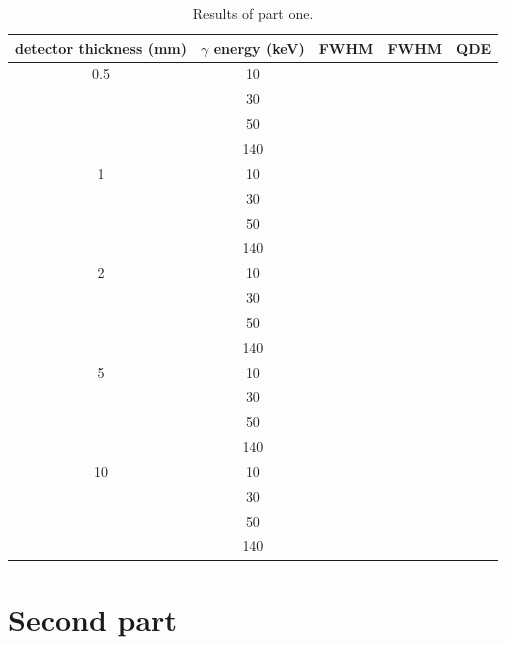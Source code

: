 \documentclass[a4paper]{article}
\begin{document}
\begin{table}
  \centering
  \begin{tabular}{|c|c|c|c|c|}
   \hline
   detector thickness (mm) & $\gamma$ energy (keV) & FWHM & FWHM & QDE \\
   \hline
   0.5 & 10 & & & \\
   \hline
    & 30 & & & \\
    \hline
    & 50 & & & \\
    \hline
    & 140 & & & \\
    \hline
   1 & 10 & & & \\
   \hline
    & 30 & & & \\
    \hline
    & 50 & & & \\
    \hline
    & 140 & & & \\
    \hline
   2 & 10 & & & \\
   \hline
    & 30 & & & \\
    \hline
    & 50 & & & \\
    \hline
    & 140 & & & \\
    \hline
   5 & 10 & & & \\
   \hline
    & 30 & & & \\
    \hline
    & 50 & & & \\
    \hline
    & 140 & & & \\
    \hline
   10 & 10 & & & \\
   \hline
    & 30 & & & \\
    \hline
    & 50 & & & \\
    \hline
    & 140 & & & \\
    \hline
  \end{tabular}
  \caption{Results of part one.}
  \label{tab:part_one}
\end{table}


\section{Second part}
\end{document}
